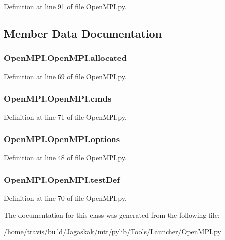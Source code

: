 Definition at line 91 of file Open\-M\-P\-I.\-py.



\subsection{Member Data Documentation}
\hypertarget{classOpenMPI_1_1OpenMPI_a9ffab4795264fde34d136269026204db}{
\subsubsection[{allocated}]{\setlength{\rightskip}{0pt plus 5cm}Open\-M\-P\-I.\-Open\-M\-P\-I.\-allocated}}\label{classOpenMPI_1_1OpenMPI_a9ffab4795264fde34d136269026204db}


Definition at line 69 of file Open\-M\-P\-I.\-py.

\hypertarget{classOpenMPI_1_1OpenMPI_a86be93bbc775c81263813274a8564efc}{
\subsubsection[{cmds}]{\setlength{\rightskip}{0pt plus 5cm}Open\-M\-P\-I.\-Open\-M\-P\-I.\-cmds}}\label{classOpenMPI_1_1OpenMPI_a86be93bbc775c81263813274a8564efc}


Definition at line 71 of file Open\-M\-P\-I.\-py.

\hypertarget{classOpenMPI_1_1OpenMPI_a4a263774614f0b83a63a26639b46b2f5}{
\subsubsection[{options}]{\setlength{\rightskip}{0pt plus 5cm}Open\-M\-P\-I.\-Open\-M\-P\-I.\-options}}\label{classOpenMPI_1_1OpenMPI_a4a263774614f0b83a63a26639b46b2f5}


Definition at line 48 of file Open\-M\-P\-I.\-py.

\hypertarget{classOpenMPI_1_1OpenMPI_acd20b78013350c2363484589ef85b67c}{
\subsubsection[{test\-Def}]{\setlength{\rightskip}{0pt plus 5cm}Open\-M\-P\-I.\-Open\-M\-P\-I.\-test\-Def}}\label{classOpenMPI_1_1OpenMPI_acd20b78013350c2363484589ef85b67c}


Definition at line 70 of file Open\-M\-P\-I.\-py.



The documentation for this class was generated from the following file\-:\begin{DoxyCompactItemize}
\item 
/home/travis/build/\-Jagaskak/mtt/pylib/\-Tools/\-Launcher/\hyperlink{OpenMPI_8py}{Open\-M\-P\-I.\-py}\end{DoxyCompactItemize}
